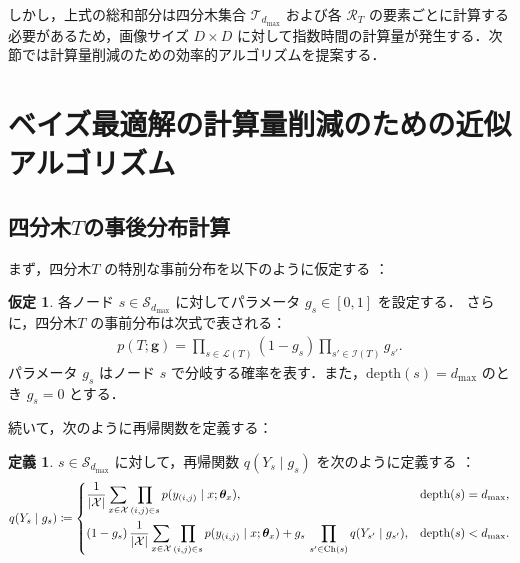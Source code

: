 \documentclass{jsarticle}
\theoremstyle{definition}
\newtheorem{defi}{定義}
\newtheorem{assumption}{仮定}
\begin{document}
しかし，上式の総和部分は四分木集合 $\mathcal{T}_{d_{\mathrm{max}}}$ および各 $\mathcal{R}_T$ の要素ごとに計算する必要があるため，画像サイズ $D\times D$ に対して指数時間の計算量が発生する．次節では計算量削減のための効率的アルゴリズムを提案する．


\section{ベイズ最適解の計算量削減のための近似アルゴリズム}

\subsection{四分木$T$の事後分布計算}

まず，四分木$T$ の特別な事前分布を以下のように仮定する \cite{b1}：
\begin{assumption}
  各ノード $s \in \mathcal{S}_{d_{\mathrm{max}}}$ に対してパラメータ $g_s\in[0,1]$ を設定する．
  さらに，四分木$T$ の事前分布は次式で表される：
  \begin{eqnarray}
    p(T;\bm{g})=\prod_{s\in \mathcal{L}(T)}(1-g_s)\prod_{s'\in \mathcal{I}(T)}g_{s'}.
  \end{eqnarray}
  パラメータ $g_s$ はノード $s$ で分岐する確率を表す．また，$\mathrm{depth}(s)=d_{\mathrm{max}}$ のとき $g_s=0$ とする．
  \label{prior_dist_T}
\end{assumption}

続いて，次のように再帰関数を定義する：
\begin{defi}
  $s\in\mathcal{S}_{d_{\mathrm{max}}}$ に対して，再帰関数 $q(Y_{s}\mid g_s)$ を次のように定義する \cite{b1}：\\
  \begin{eqnarray}
    q(Y_{s}\mid g_s) \coloneqq
    \begin{dcases}
      \frac{1}{|\mathcal{X}|} \sum_{x \in \mathcal{X}} \prod_{(i,j) \in s} p(y_{(i,j)} \mid x; \bm{\theta}_x), & \mathrm{depth}(s) = d_{\mathrm{max}},\\
      (1-g_{s})\,\frac{1}{|\mathcal{X}|} \sum_{x \in \mathcal{X}} \prod_{(i,j) \in s} p(y_{(i,j)} \mid x; \bm{\theta}_x) + g_{s}\,\displaystyle\prod_{s'\in \mathrm{Ch}(s)}q(Y_{s'}\mid g_{s'}), & \mathrm{depth}(s) < d_{\mathrm{max}}.
    \end{dcases}
  \end{eqnarray}
\end{defi}
\end{document}
